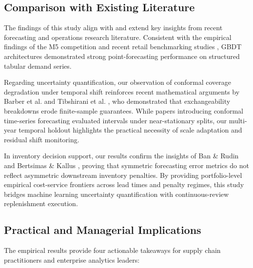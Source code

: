\subsection{Comparison with Existing Literature}
The findings of this study align with and extend key insights from recent forecasting and operations research literature. Consistent with the empirical findings of the M5 competition \cite{makridakis2022m5} and recent retail benchmarking studies \cite{hobor2026comparative}, GBDT architectures demonstrated strong point-forecasting performance on structured tabular demand series.

Regarding uncertainty quantification, our observation of conformal coverage degradation under temporal shift reinforces recent mathematical arguments by Barber et al. \cite{barber2023conformal} and Tibshirani et al. \cite{tibshirani2019conformal}, who demonstrated that exchangeability breakdowns erode finite-sample guarantees. While papers introducing conformal time-series forecasting \cite{stankeviciute2021conformal, huber2019integrating} evaluated intervals under near-stationary splits, our multi-year temporal holdout highlights the practical necessity of scale adaptation and residual shift monitoring.

In inventory decision support, our results confirm the insights of Ban \& Rudin \cite{ban2019big} and Bertsimas \& Kallus \cite{bertsimas2020predictive}, proving that symmetric forecasting error metrics do not reflect asymmetric downstream inventory penalties. By providing portfolio-level empirical cost-service frontiers across lead times and penalty regimes, this study bridges machine learning uncertainty quantification with continuous-review replenishment execution.

\subsection{Practical and Managerial Implications}
The empirical results provide four actionable takeaways for supply chain practitioners and enterprise analytics leaders:

